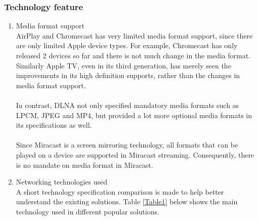 \subsubsection{Technology feature} 
\begin{enumerate} 
\item Media format support \\ 
AirPlay and Chromecast has very limited media format support, since there are 
only limited Apple device types. For example, Chromecast has only released 2 devices so far and there is not much change in the media format. Similarly Apple TV, even in its third generation,  has merely seen the improvements in its high definition supports, rather than the changes in media format support.  \\
\\
In contrast, DLNA not only specified mandatory media formats such as LPCM, JPEG  and MP4, but provided a lot more optional media formats in its specifications as well. \\
\\
Since Miracast is a screen mirroring technology, all formats that can be played on a device are supported in Miracast streaming. Consequently, there is no mandate on media format in Miracast.  

\item Networking technologies used \\ 

A short technology specification comparison is made to help better understand
the existing solutions. Table \ref{Table1} below shows the main technology used 
in different popular solutions. 
\begin{table}[htb] 
\caption{Technology used comparison\label{Table1}} 
\begin{center} 
\end{center} 
\end{table} 


\end{enumerate}
